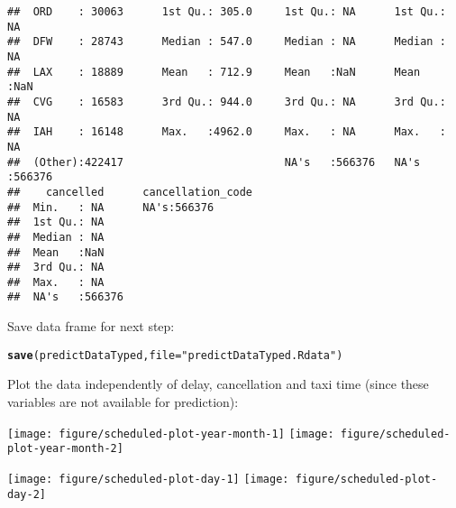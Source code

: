 \documentclass{article}\usepackage[]{graphicx}\usepackage[]{color}
\makeatletter
\newcommand{\hlstr}[1]{\textcolor[rgb]{0.192,0.494,0.8}{#1}}%
\newcommand{\hlstd}[1]{\textcolor[rgb]{0.345,0.345,0.345}{#1}}%
\newcommand{\hlkwc}[1]{\textcolor[rgb]{0.333,0.667,0.333}{#1}}%
\newcommand{\hlkwd}[1]{\textcolor[rgb]{0.737,0.353,0.396}{\textbf{#1}}}%
\newenvironment{kframe}{%
 \def\at@end@of@kframe{}%
 \ifinner\ifhmode%
  \def\at@end@of@kframe{\end{minipage}}%
  \begin{minipage}{\columnwidth}%
 \fi\fi%
 \def\FrameCommand##1{\hskip\@totalleftmargin \hskip-\fboxsep
 \colorbox{shadecolor}{##1}\hskip-\fboxsep
     \hskip-\linewidth \hskip-\@totalleftmargin \hskip\columnwidth}%
 \MakeFramed {\advance\hsize-\width
   \@totalleftmargin\z@ \linewidth\hsize
   \@setminipage}}%
 {\par\unskip\endMakeFramed%
 \at@end@of@kframe}
\newenvironment{knitrout}{}{} %
\makeatother
\begin{document}
\begin{knitrout}
\begin{kframe}
\begin{verbatim}
##  ORD    : 30063      1st Qu.: 305.0     1st Qu.: NA      1st Qu.: NA     
##  DFW    : 28743      Median : 547.0     Median : NA      Median : NA     
##  LAX    : 18889      Mean   : 712.9     Mean   :NaN      Mean   :NaN     
##  CVG    : 16583      3rd Qu.: 944.0     3rd Qu.: NA      3rd Qu.: NA     
##  IAH    : 16148      Max.   :4962.0     Max.   : NA      Max.   : NA     
##  (Other):422417                         NA's   :566376   NA's   :566376  
##    cancelled      cancellation_code
##  Min.   : NA      NA's:566376      
##  1st Qu.: NA                       
##  Median : NA                       
##  Mean   :NaN                       
##  3rd Qu.: NA                       
##  Max.   : NA                       
##  NA's   :566376
\end{verbatim}
\end{kframe}
\end{knitrout}

Save data frame for next step:
\begin{knitrout}
\color{fgcolor}\begin{kframe}
\begin{alltt}
\hlkwd{save}\hlstd{(predictDataTyped,} \hlkwc{file}\hlstd{=}\hlstr{"predictDataTyped.Rdata"}\hlstd{)}
\end{alltt}
\end{kframe}
\end{knitrout}




Plot the data independently of delay, cancellation and taxi time (since these variables are not available for prediction):
  


\begin{knitrout}
\color{fgcolor}

{\centering \texttt{[image: figure/scheduled-plot-year-month-1]} 
\texttt{[image: figure/scheduled-plot-year-month-2]} 

}



\end{knitrout}

\begin{knitrout}
\color{fgcolor}

{\centering \texttt{[image: figure/scheduled-plot-day-1]} 
\texttt{[image: figure/scheduled-plot-day-2]} 

}



\end{knitrout}
\end{document}
